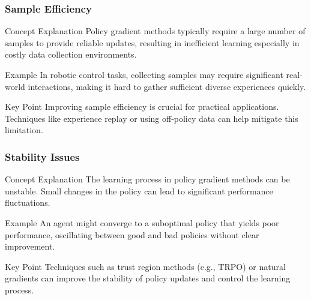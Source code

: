 \documentclass[aspectratio=169]{beamer}
\begin{document}
\begin{frame}[fragile]
    \frametitle{Sample Efficiency}
    \begin{block}{Concept Explanation}
        Policy gradient methods typically require a large number of samples to provide reliable updates, resulting in inefficient learning especially in costly data collection environments.
    \end{block}

    \begin{block}{Example}
        In robotic control tasks, collecting samples may require significant real-world interactions, making it hard to gather sufficient diverse experiences quickly.
    \end{block}

    \begin{block}{Key Point}
        Improving sample efficiency is crucial for practical applications. Techniques like experience replay or using off-policy data can help mitigate this limitation.
    \end{block}
\end{frame}

\begin{frame}[fragile]
    \frametitle{Stability Issues}
    \begin{block}{Concept Explanation}
        The learning process in policy gradient methods can be unstable. Small changes in the policy can lead to significant performance fluctuations.
    \end{block}

    \begin{block}{Example}
        An agent might converge to a suboptimal policy that yields poor performance, oscillating between good and bad policies without clear improvement.
    \end{block}

    \begin{block}{Key Point}
        Techniques such as trust region methods (e.g., TRPO) or natural gradients can improve the stability of policy updates and control the learning process.
    \end{block}
\end{frame}
\end{document}
